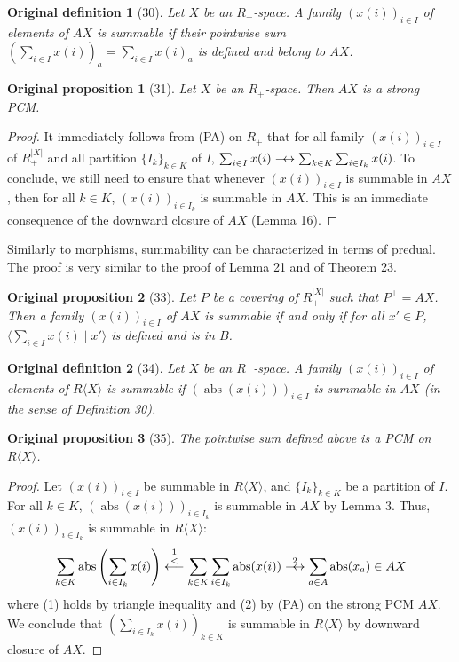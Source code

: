 \documentclass[10pt,a4paper]{article}
\newcommand{\abs}{\operatorname{abs}}
\newcommand{\dequiv}{\mathrel{\relbar\joinrel\leftrightarrow}}
\newcommand{\scalar}[2]{\langle #1\mid #2\rangle}
\newcommand{\Rmod}[1]{R\langle #1\rangle}
\newtheorem*{originaldef}{Original definition}
\newtheorem*{originalprop}{Original proposition}
\newcommand{\dleleft}{\mathrel{\stackrel{<}{\leftarrow\joinrel\relbar}}}
\begin{document}
\begin{originaldef}[30] Let $X$ be an $R_+$-space. A family $(x(i))_{i\in I}$ of elements of $AX$ is summable if their pointwise sum $(\sum_{i\in I}x(i))_a=\sum_{i\in I}x(i)_a$ is defined and belong to $AX$.\end{originaldef}
\begin{originalprop}[31] Let $X$ be an $R_+$-space. Then $AX$ is a strong PCM.\end{originalprop}
\begin{proof}It immediately follows from (PA) on $R_+$ that for all family $(x(i))_{i\in I}$ of $R_+^{|X|}$ and all partition $\{I_k\}_{k\in K}$ of $I$, $\sum_{i\in I}x(i)\dequiv\sum_{k\in K}\sum_{i\in I_k}x(i)$. To conclude, we still need to ensure that whenever $(x(i))_{i\in I}$ is summable in $AX$, then for all $k\in K$, $(x(i))_{i\in I_k}$ is summable in $AX$. This is an immediate consequence of the downward closure of $AX$ (Lemma 16).\end{proof}
Similarly to morphisms, summability can be characterized in terms of predual. The proof is very similar to the proof of Lemma 21 and of Theorem 23.
\begin{originalprop}[33] Let $P$ be a covering of $R_+^{|X|}$ such that $P^\perp=AX$. Then a family $(x(i))_{i\in I}$ of $AX$ is summable if and only if for all $x'\in P$, $\scalar{\sum_{i\in I}x(i)}{x'}$ is defined and is in $B$.\end{originalprop}
\begin{originaldef}[34] Let $X$ be an $R_+$-space. A family $(x(i))_{i\in I}$ of elements of $\Rmod{X}$ is summable if $(\abs(x(i)))_{i\in I}$ is summable in $AX$ (in the sense of Definition 30).\end{originaldef}
\begin{originalprop}[35] The pointwise sum defined above is a PCM on $\Rmod{X}$.\end{originalprop}
\begin{proof} Let $(x(i))_{i\in I}$ be summable in $\Rmod{X}$, and $\{I_k\}_{k\in K}$ be a partition of $I$. For all $k\in K$, $(\abs(x(i)))_{i\in I_k}$ is summable in $AX$ by Lemma 3. Thus, $(x(i))_{i\in I_k}$ is summable in $\Rmod{X}$:
\[\sum_{k\in K}\abs\left(\sum_{i\in I_k}x(i)\right)\mathrel{\stackrel{1}{\dleleft}}\sum_{k\in K}\sum_{i\in I_k}\abs(x(i))\mathrel{\stackrel{2}{\dequiv}}\sum_{a\in A}\abs(x_a)\in AX\]
where (1) holds by triangle inequality and (2) by (PA) on the strong PCM $AX$. We conclude that $(\sum_{i\in I_k}x(i))_{k\in K}$ is summable in $\Rmod{X}$ by downward closure of $AX$.\end{proof}
\end{document}
